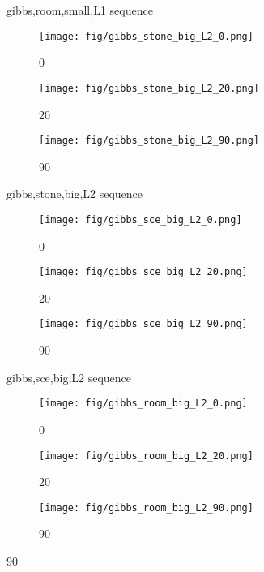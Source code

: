 \begin{figure}
  \caption{gibbs,room,small,L1 sequence}
  \label{fig:three_images}
\end{figure}\begin{figure} 
    \centering
    \begin{subfigure}[b]{0.3\textwidth}
    \texttt{[image: fig/gibbs\_stone\_big\_L2\_0.png]}
    \caption{0}
    \label{fig:image1}
  \end{subfigure}
  \hfill
  \begin{subfigure}[b]{0.3\textwidth}
    \texttt{[image: fig/gibbs\_stone\_big\_L2\_20.png]}
    \caption{20}
    \label{fig:image2}
  \end{subfigure}
  \hfill
  \begin{subfigure}[b]{0.3\textwidth}
    \texttt{[image: fig/gibbs\_stone\_big\_L2\_90.png]}
    \caption{90}
    \label{fig:image3}
  \end{subfigure}

  \caption{gibbs,stone,big,L2 sequence}
  \label{fig:three_images}
\end{figure}\begin{figure} 
    \centering
    \begin{subfigure}[b]{0.3\textwidth}
    \texttt{[image: fig/gibbs\_sce\_big\_L2\_0.png]}
    \caption{0}
    \label{fig:image1}
  \end{subfigure}
  \hfill
  \begin{subfigure}[b]{0.3\textwidth}
    \texttt{[image: fig/gibbs\_sce\_big\_L2\_20.png]}
    \caption{20}
    \label{fig:image2}
  \end{subfigure}
  \hfill
  \begin{subfigure}[b]{0.3\textwidth}
    \texttt{[image: fig/gibbs\_sce\_big\_L2\_90.png]}
    \caption{90}
    \label{fig:image3}
  \end{subfigure}

  \caption{gibbs,sce,big,L2 sequence}
  \label{fig:three_images}
\end{figure}\begin{figure} 
    \centering
    \begin{subfigure}[b]{0.3\textwidth}
    \texttt{[image: fig/gibbs\_room\_big\_L2\_0.png]}
    \caption{0}
    \label{fig:image1}
  \end{subfigure}
  \hfill
  \begin{subfigure}[b]{0.3\textwidth}
    \texttt{[image: fig/gibbs\_room\_big\_L2\_20.png]}
    \caption{20}
    \label{fig:image2}
  \end{subfigure}
  \hfill
  \begin{subfigure}[b]{0.3\textwidth}
    \texttt{[image: fig/gibbs\_room\_big\_L2\_90.png]}
    \caption{90}
    \label{fig:image3}
  \end{subfigure}


\end{figure}
